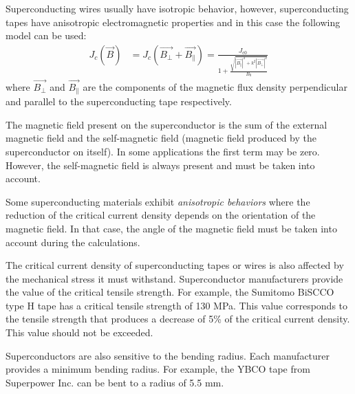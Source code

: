 \documentclass{ws-jmrr}
\begin{document}
\begin{multicols}{2}
Superconducting wires usually have isotropic behavior, however, superconducting tapes have anisotropic electromagnetic properties and in this case the following model can be used:
\begin{align}
J_c(\vec{B})&=J_c(\vec{B_{\perp}}+\vec{B_{\parallel}})=\frac{J_{\textrm{c0}}}{1+\frac{\sqrt{|\vec{B_{\parallel}}|^2+k^2|\vec{B_{\perp}}|^2}}{B_0}}
\label{model2}
\end{align}
where $\vec{B_{\perp}}$ and $\vec{B_{\parallel}}$ are the components of the magnetic flux density perpendicular and parallel to the superconducting tape respectively.\par
The magnetic field present on the superconductor is the sum of the external magnetic field and the self-magnetic field (magnetic field produced by the superconductor on itself). In some applications the first term may be zero. However, the self-magnetic field is always present and must be taken into account. \par
Some superconducting materials exhibit \emph{anisotropic behaviors} where the reduction of the critical current density depends on the orientation of the magnetic field. In that case, the angle of the magnetic field must be taken into account during the calculations.\par
The critical current density of superconducting tapes or wires is also affected by the mechanical stress it must withstand. Superconductor manufacturers provide the value of the critical tensile strength. For example, the Sumitomo BiSCCO type H tape has a critical tensile strength of 130 MPa. This value corresponds to the tensile strength that produces a decrease of 5\% of the critical current density. This value should not be exceeded.\par
Superconductors are also sensitive to the bending radius. Each manufacturer provides a minimum bending radius. For example, the YBCO tape from Superpower Inc. can be bent to a radius of 5.5 mm.



\end{multicols}
\end{document}

